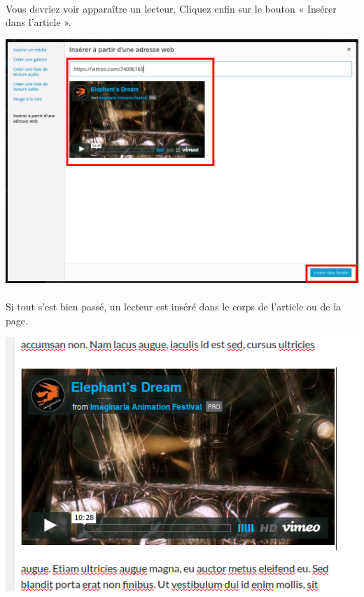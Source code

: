 \documentclass[10pt,a4paper]{article}
\begin{document}
\paragraph{}Vous devriez voir apparaître un lecteur. Cliquez enfin sur le bouton « Insérer dans l'article ».
\begin{center}
\includegraphics[scale=0.25]{img/0141.png}
\end{center}
\paragraph{}Si tout s'est bien passé, un lecteur est inséré dans le corps de l'article ou de la page.
\begin{center}
\includegraphics[scale=0.3]{img/0142.png}
\end{center}
\newpage
\end{document}
